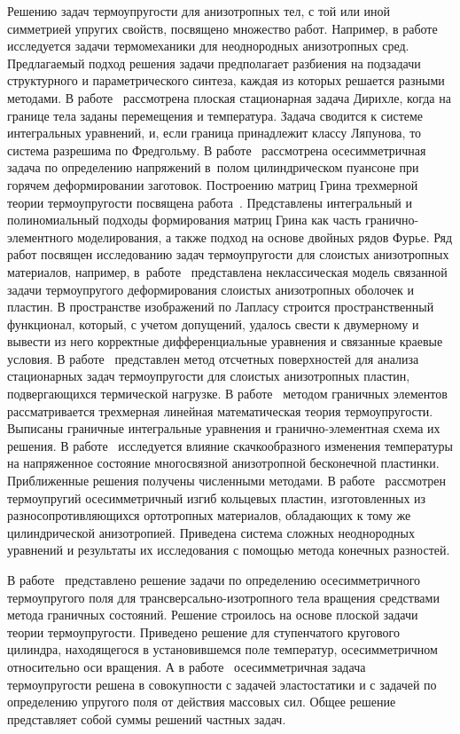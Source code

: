 \documentclass[press]{vestnik}
\begin{document}
Решению задач термоупругости для анизотропных тел, с той или иной симметрией 
упругих свойств, посвящено множество работ. Например, в работе~\cite{B01} 
исследуется задачи термомеханики для неоднородных анизотропных сред. 
Предлагаемый подход решения задачи предполагает разбиения на подзадачи 
структурного и параметрического синтеза, каждая из которых решается разными 
методами. В работе~\cite{B02} рассмотрена плоская стационарная задача Дирихле, 
когда на границе тела заданы перемещения и температура. Задача сводится к 
системе интегральных уравнений, и, если граница принадлежит классу Ляпунова, 
то система разрешима по Фредгольму. В работе~\cite{B03} рассмотрена осесимметричная 
задача по определению напряжений в~полом цилиндрическом пуансоне при горячем 
деформировании заготовок. Построению матриц Грина трехмерной теории 
термоупругости посвящена работа~\cite{B04}. Представлены интегральный и 
полиномиальный подходы формирования матриц Грина как часть 
гранично-элементного моделирования, а также подход на основе двойных рядов 
Фурье. Ряд работ посвящен исследованию задач термоупругости для слоистых 
анизотропных материалов, например, в~работе~\cite{B05} представлена неклассическая 
модель связанной задачи термоупругого деформирования слоистых анизотропных 
оболочек и пластин. В пространстве изображений по Лапласу строится 
пространственный функционал, который, с учетом допущений, удалось свести к 
двумерному и вывести из него корректные дифференциальные уравнения и 
связанные краевые условия. В работе~\cite{B06} представлен метод отсчетных 
поверхностей для анализа стационарных задач термоупругости для слоистых 
анизотропных пластин, подвергающихся термической нагрузке. В работе~\cite{B07} 
методом граничных элементов рассматривается трехмерная линейная 
математическая теория термоупругости. Выписаны граничные интегральные 
уравнения и гранично-элементная схема их решения. В работе~\cite{B08} исследуется 
влияние скачкообразного изменения температуры на напряженное состояние 
многосвязной анизотропной бесконечной пластинки. Приближенные решения 
получены численными методами. В работе~\cite{B09} рассмотрен термоупругий 
осесимметричный изгиб кольцевых пластин, изготовленных из 
разносопротивляющихся ортотропных материалов, обладающих к тому же 
цилиндрической анизотропией. Приведена система сложных неоднородных 
уравнений и результаты их исследования с помощью метода конечных разностей.

В работе~\cite{B10} представлено решение задачи по определению осесимметричного 
термоупругого поля для трансверсально-изотропного тела вращения средствами 
метода граничных состояний. Решение строилось на основе плоской задачи 
теории термоупругости. Приведено решение для ступенчатого кругового 
цилиндра, находящегося в установившемся поле температур, осесимметричном 
относительно оси вращения. А в работе~\cite{B11} осесимметричная задача 
термоупругости решена в совокупности с задачей эластостатики и с задачей по 
определению упругого поля от действия массовых сил. Общее решение 
представляет собой суммы решений частных задач.
\end{document}
